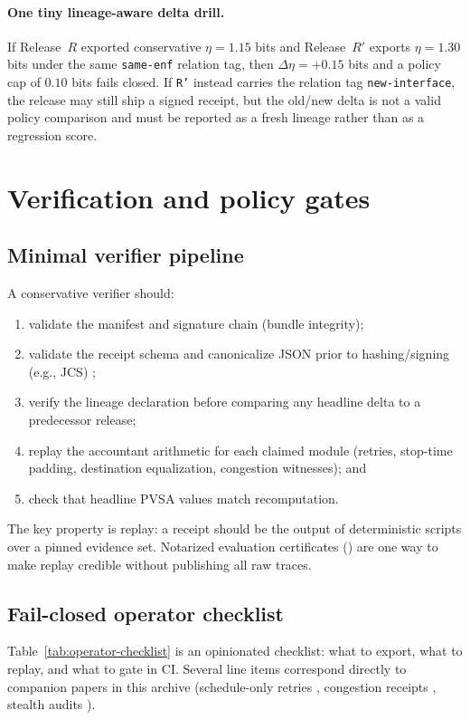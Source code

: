 \documentclass[11pt]{article}
\begin{document}
\paragraph{One tiny lineage-aware delta drill.} If Release~\(R\) exported conservative \(\eta=1.15\) bits and Release~\(R'\) exports \(\eta=1.30\) bits under the same \texttt{same-enf} relation tag, then \(\Delta \eta = +0.15\) bits and a policy cap of \(0.10\) bits fails closed. If \texttt{R'} instead carries the relation tag \texttt{new-interface}, the release may still ship a signed receipt, but the old/new delta is not a valid policy comparison and must be reported as a fresh lineage rather than as a regression score.

\section{Verification and policy gates}
\subsection{Minimal verifier pipeline}
A conservative verifier should:
\begin{enumerate}[leftmargin=1.4em]
\item validate the manifest and signature chain (bundle integrity);
\item validate the receipt schema and canonicalize JSON prior to hashing/signing (e.g., JCS) \cite{rfc8785};
\item verify the lineage declaration before comparing any headline delta to a predecessor release;
\item replay the accountant arithmetic for each claimed module (retries, stop-time padding, destination equalization, congestion witnesses); and
\item check that headline PVSA values match recomputation.
\end{enumerate}
The key property is replay: a receipt should be the output of deterministic scripts over a pinned evidence set.
Notarized evaluation certificates (\cite{series:evalnotary}) are one way to make replay credible without publishing all raw traces.

\subsection{Fail-closed operator checklist}
Table~\ref{tab:operator-checklist} is an opinionated checklist: what to export, what to replay, and what to gate in CI.
Several line items correspond directly to companion papers in this archive (schedule-only retries \cite{series:schedretries}, congestion receipts \cite{series:wcongeq}, stealth audits \cite{series:advantagecontracts}).
\end{document}
